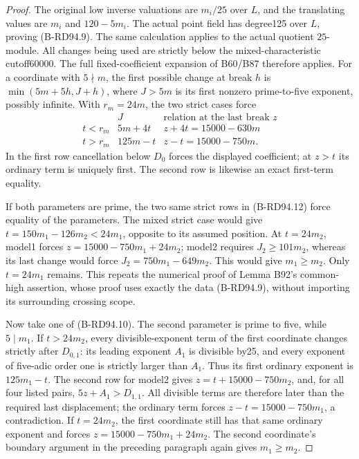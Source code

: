 \begin{proof}
The original low inverse valuations are $m_i/25$ over $L$, and
the translating values are $m_i$ and $120-5m_i$. The actual point
field has degree125 over $L$, proving (B-RD94.9). The same
calculation applies to the actual quotient $25$-module. All changes
being used are strictly below the mixed-characteristic cutoff60000.
The full fixed-coefficient expansion of B60/B87 therefore applies.
For a coordinate with $5\nmid m$, the first possible change at
break $h$ is
$\min(5m+5h,J+h)$, where $J>5m$ is its first nonzero prime-to-five
exponent, possibly infinite. With $r_m=24m$, the two strict cases
force
\[
\begin{array}{c|c|c}
 &J&\text{relation at the last break }z\\\hline
 t<r_m&5m+4t&z+4t=15000-630m\\
 t>r_m&125m-t&z-t=15000-750m.
\end{array}                                           \tag{B-RD94.12}
\]
In the first row cancellation below $D_0$ forces the displayed
coefficient; at $z>t$ its ordinary term is uniquely first. The
second row is likewise an exact first-term equality.

If both parameters are prime, the two same strict rows in
(B-RD94.12) force equality of the parameters. The mixed strict
case would give $t=150m_1-126m_2<24m_1$, opposite to its assumed
position. At $t=24m_2$, model1 forces
$z=15000-750m_1+24m_2$; model2 requires
$J_2\ge101m_2$, whereas its last change would force
$J_2=750m_1-649m_2$. This would give $m_1\ge m_2$.
Only $t=24m_1$ remains. This repeats the numerical proof of
Lemma B92's common-high assertion, whose proof uses exactly the
data (B-RD94.9), without importing its surrounding crossing scope.

Now take one of (B-RD94.10). The second parameter is prime to five,
while $5\mid m_1$. If $t>24m_2$, every divisible-exponent term
of the first coordinate changes strictly after $D_{0,1}$:
its leading exponent $A_1$ is divisible by25, and every exponent
of five-adic order one is strictly larger than $A_1$. Thus its
first ordinary exponent is $125m_1-t$. The second row for model2
gives $z=t+15000-750m_2$, and, for all four listed pairs,
$5z+A_1>D_{1,1}$. All divisible terms are therefore later than
the required last displacement; the ordinary term forces
$z-t=15000-750m_1$, a contradiction. If $t=24m_2$, the first
coordinate still has that same ordinary exponent and forces
$z=15000-750m_1+24m_2$. The second coordinate's boundary argument
in the preceding paragraph again gives $m_1\ge m_2$.


\end{proof}
